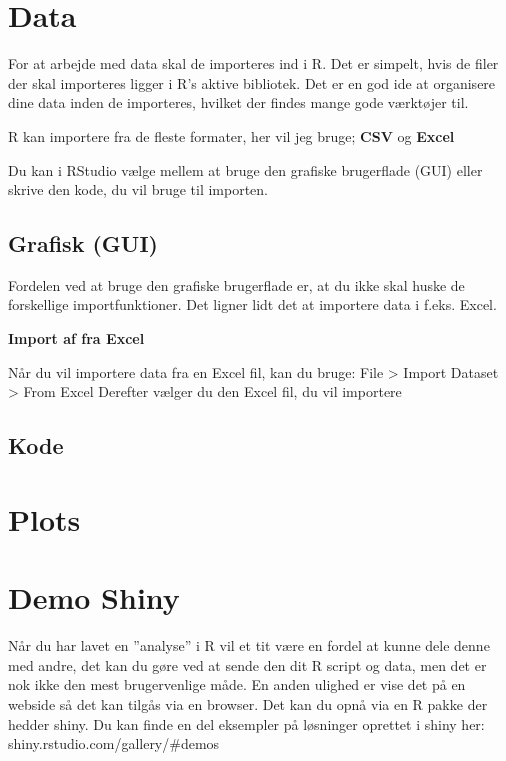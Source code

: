 \documentclass[
]{book}
\begin{document}
\hypertarget{data}{%
\chapter{Data}\label{data}}

For at arbejde med data skal de importeres ind i R. Det er simpelt, hvis de filer der skal importeres ligger i R's aktive bibliotek. Det er en god ide at organisere dine data inden de importeres, hvilket der findes mange gode værktøjer til.

R kan importere fra de fleste formater, her vil jeg bruge; \textbf{CSV} og \textbf{Excel}

Du kan i RStudio vælge mellem at bruge den grafiske brugerflade (GUI) eller skrive den kode, du vil bruge til importen.

\hypertarget{grafisk-gui}{%
\section{Grafisk (GUI)}\label{grafisk-gui}}

Fordelen ved at bruge den grafiske brugerflade er, at du ikke skal huske de forskellige importfunktioner. Det ligner lidt det at importere data i f.eks. Excel.

\textbf{Import af fra Excel}

Når du vil importere data fra en Excel fil, kan du bruge: File \textgreater{} Import Dataset \textgreater{} From Excel
Derefter vælger du den Excel fil, du vil importere

\hypertarget{kode-1}{%
\section{Kode}\label{kode-1}}

\hypertarget{plots}{%
\chapter{Plots}\label{plots}}

\hypertarget{shiny}{%
\chapter{Demo Shiny}\label{shiny}}

Når du har lavet en ''analyse'' i R vil et tit være en fordel at kunne dele denne med andre, det kan du gøre ved at sende den dit R script og data, men det er nok ikke den mest brugervenlige måde.
En anden ulighed er vise det på en webside så det kan tilgås via en browser. Det kan du opnå via en R pakke der hedder shiny.
Du kan finde en del eksempler på løsninger oprettet i shiny her: shiny.rstudio.com/gallery/\#demos
\end{document}
